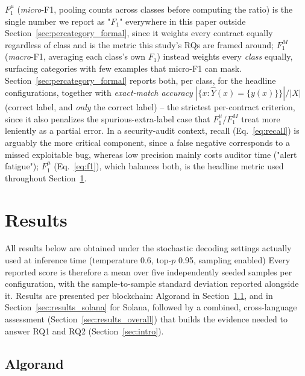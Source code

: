 \documentclass[lettersize,journal]{IEEEtran}
\begin{document}
$F_1^{\mu}$ (\emph{micro}-F1, pooling counts across classes before computing the ratio) is the
single number we report as "$F_1$" everywhere in this paper outside
Section~\ref{sec:percategory_formal}, since it weights every contract equally regardless of class
and is the metric this study's RQs are framed around; $F_1^{M}$ (\emph{macro}-F1, averaging each
class's own $F_1$) instead weights every \emph{class} equally, surfacing categories with few
examples that micro-F1 can mask. Section~\ref{sec:percategory_formal} reports both, per class, for
the headline configurations, together with \emph{exact-match accuracy} $|\{x : \hat{Y}(x) =
\{y(x)\}\}|/|X|$ (correct label, and \emph{only} the correct label) -- the strictest per-contract
criterion, since it also penalizes the spurious-extra-label case that $F_1^{\mu}/F_1^{M}$ treat more
leniently as a partial error. In a security-audit context, recall (Eq.~\eqref{eq:recall}) is
arguably the more critical component, since a false negative corresponds to a missed exploitable
bug, whereas low precision mainly costs auditor time ("alert fatigue"); $F_1^{\mu}$
(Eq.~\eqref{eq:f1}), which balances both, is the headline metric used throughout
Section~\ref{sec:results}.

\section{Results}
\label{sec:results}

All results below are obtained under the stochastic decoding settings actually used at inference
time (temperature 0.6, top-$p$ 0.95, sampling enabled) 
Every reported score is
therefore a mean over five independently seeded samples per configuration, with the
sample-to-sample standard deviation reported alongside it. Results are presented per 
blockchain: Algorand
 in Section~\ref{sec:results_algorand}, and in Section~\ref{sec:results_solana} for Solana, followed by 
 a combined, cross-language assessment (Section~\ref{sec:results_overall}) that builds the evidence
needed to answer RQ1 and RQ2 (Section~\ref{sec:intro}).

\subsection{Algorand}
\label{sec:results_algorand}
\end{document}
